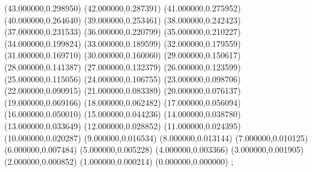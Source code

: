 {(43.000000,0.298950)
(42.000000,0.287391)
(41.000000,0.275952)
(40.000000,0.264640)
(39.000000,0.253461)
(38.000000,0.242423)
(37.000000,0.231533)
(36.000000,0.220799)
(35.000000,0.210227)
(34.000000,0.199824)
(33.000000,0.189599)
(32.000000,0.179559)
(31.000000,0.169710)
(30.000000,0.160060)
(29.000000,0.150617)
(28.000000,0.141387)
(27.000000,0.132379)
(26.000000,0.123599)
(25.000000,0.115056)
(24.000000,0.106755)
(23.000000,0.098706)
(22.000000,0.090915)
(21.000000,0.083389)
(20.000000,0.076137)
(19.000000,0.069166)
(18.000000,0.062482)
(17.000000,0.056094)
(16.000000,0.050010)
(15.000000,0.044236)
(14.000000,0.038780)
(13.000000,0.033649)
(12.000000,0.028852)
(11.000000,0.024395)
(10.000000,0.020287)
(9.000000,0.016534)
(8.000000,0.013144)
(7.000000,0.010125)
(6.000000,0.007484)
(5.000000,0.005228)
(4.000000,0.003366)
(3.000000,0.001905)
(2.000000,0.000852)
(1.000000,0.000214)
(0.000000,0.000000)
};
